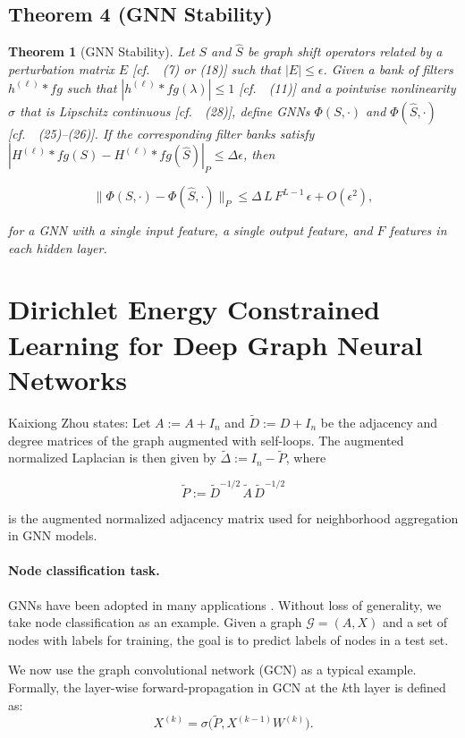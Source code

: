 \documentclass[11pt]{article}\usepackage{amsmath,amssymb,amsthm,bbm}
\newtheorem{theorem}{Theorem}
\newcommand{\1}{\mathbbm{1}}
\begin{document}
\subsection*{Theorem 4 (GNN Stability)}
\begin{theorem}[GNN Stability]
Let $S$ and $\hat S$ be graph shift operators related by a perturbation matrix $E$ [cf.~~(7) or (18)] such that $|E|\le\epsilon$. Given a bank of filters ${h^{(\ell)}*{fg}}$ such that $|h^{(\ell)}*{fg}(\lambda)|\le1$ [cf.~~(11)] and a pointwise nonlinearity $\sigma$ that is Lipschitz continuous [cf.~~(28)], define GNNs $\Phi(S,\cdot)$ and $\Phi(\hat S,\cdot)$ [cf.~~(25)--(26)]. If the corresponding filter banks satisfy $|H^{(\ell)}*{fg}(S)-H^{(\ell)}*{fg}(\hat S)|_P\le\Delta\epsilon$, then

$$
\|\Phi(S,\cdot) - \Phi(\hat S,\cdot)\|_P \le \Delta\,L\,F^{L-1}\,\epsilon + O(\epsilon^2),
$$

for a GNN with a single input feature, a single output feature, and $F$ features in each hidden layer.
\end{theorem}

\section*{Dirichlet Energy Constrained Learning for Deep Graph Neural Networks}
Kaixiong Zhou states:
Let $A := A + I_n$ and $\tilde D := D + I_n$ be the adjacency and degree matrices of the graph augmented with self-loops. The augmented normalized Laplacian is then given by $\tilde \Delta := I_n - \tilde P$, where

$$
\tilde P := \tilde D^{-1/2}\,\tilde A\,\tilde D^{-1/2}
$$

is the augmented normalized adjacency matrix used for neighborhood aggregation in GNN models.

\paragraph{Node classification task.} GNNs have been adopted in many applications \cite{6,11,34}. Without loss of generality, we take node classification as an example. Given a graph $\mathcal{G}=(A,X)$ and a set of nodes with labels for training, the goal is to predict labels of nodes in a test set.

We now use the graph convolutional network (GCN) \cite{15} as a typical example. Formally, the layer-wise forward-propagation in GCN at the $k$th layer is defined as:
\begin{equation}\label{eq:gcn}
X^{(k)} = \sigma\bigl(\tilde P,X^{(k-1)} W^{(k)}\bigr).
\end{equation}
\end{document}
